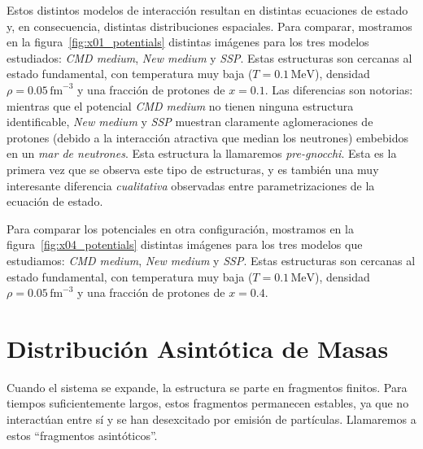 Estos distintos modelos de interacción resultan en distintas ecuaciones de estado y, en consecuencia, distintas distribuciones espaciales.
Para comparar, mostramos en la figura~\ref{fig:x01_potentials} distintas imágenes para los tres modelos estudiados: \emph{CMD medium}, \emph{New medium} y \emph{SSP}.
Estas estructuras son cercanas al estado fundamental, con temperatura muy baja ($T = 0.1\,\text{MeV}$), densidad $\rho = 0.05\,\text{fm}^{-3}$ y una fracción de protones de $x = 0.1$.
Las diferencias son notorias: mientras que el potencial \emph{CMD medium} no tienen ninguna estructura identificable, \emph{New medium} y \emph{SSP} muestran claramente aglomeraciones de protones (debido a la interacción atractiva que median los neutrones) embebidos en un \emph{mar de neutrones}.
Esta estructura la llamaremos \emph{pre-gnocchi}.
Esta es la primera vez que se observa este tipo de estructuras, y es también una muy interesante diferencia \emph{cualitativa} observadas entre parametrizaciones de la ecuación de estado.

Para comparar los potenciales en otra configuración, mostramos en la figura~\ref{fig:x04_potentials} distintas imágenes para los tres modelos que estudiamos: \emph{CMD medium}, \emph{New medium} y \emph{SSP}.
Estas estructuras son cercanas al estado fundamental, con temperatura muy baja ($T = 0.1\,\text{MeV}$), densidad $\rho = 0.05\,\text{fm}^{-3}$ y una fracción de protones de $x = 0.4$.

\section{Distribución Asintótica de Masas}
Cuando el sistema se expande, la estructura se parte en fragmentos finitos.
Para tiempos suficientemente largos, estos fragmentos permanecen estables, ya que no interactúan entre sí y se han desexcitado por emisión de partículas.
Llamaremos a estos ``fragmentos asintóticos''.

